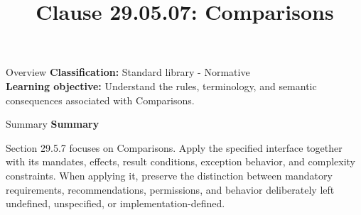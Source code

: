 \documentclass[10pt,letterpaper]{article}
\title{Clause 29.05.07: Comparisons}
\author{}
\date{}
\begin{document}
\maketitle
\begin{CornellOverviewBox}{Overview}
\textbf{Classification:} Standard library - Normative\\[2pt]
\textbf{Learning objective:} Understand the rules, terminology, and semantic consequences associated with Comparisons.
\end{CornellOverviewBox}\begin{CornellSummaryBox}{Summary}
{\sffamily\bfseries\color{Accent} Summary}\par\vspace{3pt}Section 29.5.7 focuses on Comparisons. Apply the specified interface together with its mandates, effects, result conditions, exception behavior, and complexity constraints. When applying it, preserve the distinction between mandatory requirements, recommendations, permissions, and behavior deliberately left undefined, unspecified, or implementation-defined.
\end{CornellSummaryBox}
\end{document}
